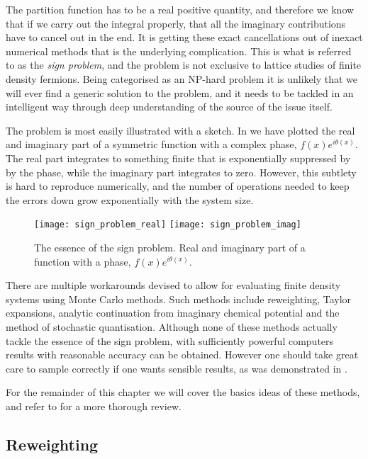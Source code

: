 The partition function has to be a real positive quantity, and therefore we know
that if we carry out the integral properly, that all the imaginary contributions
have to cancel out in the end. It is getting these exact cancellations out of
inexact numerical methods that is the underlying complication. This is what is
referred to as the \emph{sign problem}, and the problem is not exclusive to
lattice studies of finite density fermions. Being categorised as an NP-hard
problem it is unlikely that we will ever find a generic solution to the problem,
and it needs to be tackled in an intelligent way through deep understanding of
the source of the issue itself.

The problem is most easily illustrated with a sketch. In
 we have plotted the real and imaginary part of a
symmetric function with a complex phase, $f(x) e^{i \theta(x)}$. The real part
integrates to something finite that is exponentially suppressed by by the phase,
while the imaginary part integrates to zero. However, this subtlety is hard to
reproduce numerically, and the number of operations needed to keep the errors
down grow exponentially with the system size.
%
\begin{figure}
  \texttt{[image: sign\_problem\_real]}
  \texttt{[image: sign\_problem\_imag]}
  \label{fig-sign-problem}
  \caption{The essence of the sign problem. Real and imaginary part of a
    function with a phase, $f(x) e^{i \theta(x)}$.}
\end{figure}


There are multiple workarounds devised to allow for evaluating finite density
systems using Monte Carlo methods. Such methods include reweighting, Taylor
expansions, analytic continuation from imaginary chemical potential and  the
method of stochastic quantisation. Although none of these methods actually
tackle the essence of the sign problem, with sufficiently powerful computers 
results with reasonable accuracy can be obtained. However one should take great
care to sample correctly if one wants sensible results, as was demonstrated in
\citep{Osborn:2008eg}.

For the remainder of this chapter we will cover the basics ideas of these
methods, and refer to \citep{deForcrand:2010ys} for a more thorough review.

\subsection{Reweighting}


